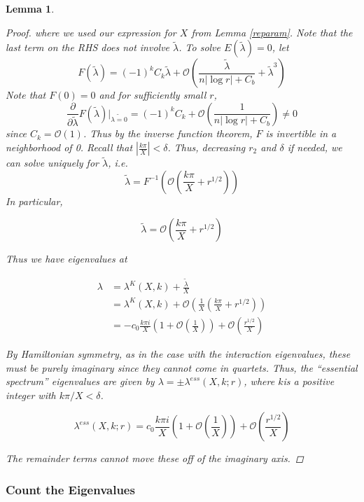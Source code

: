 \documentclass[12pt]{article}
\newtheorem{lemma}{Lemma}
\begin{document}
\begin{lemma}
\begin{proof}
where we used our expression for $X$ from Lemma \ref{reparam}. Note that the last term on the RHS does not involve $\tilde{\lambda}$. To solve $E(\tilde{\lambda}) = 0$, let
\[
F(\tilde{\lambda}) = (-1)^k C_k \tilde{\lambda} + \mathcal{O}\left( \frac{\tilde{\lambda}}{n|\log r| + C_b} + \tilde{\lambda}^3 \right)
\]
Note that $F(0) = 0$ and for sufficiently small $r$, 
\[
\frac{\partial}{\partial\tilde{\lambda}}F(\tilde{\lambda})\big|_{\tilde{\lambda = 0}}
= (-1)^k C_k + \mathcal{O}\left( \frac{1}{n|\log r| + C_b} \right) \neq 0
\]
since $C_k = \mathcal{O}(1)$. Thus by the inverse function theorem, $F$ is invertible in a neighborhood of 0. Recall that  $|\frac{k \pi}{X}| < \delta$. Thus, decreasing $r_2$ and $\delta$ if needed, we can solve uniquely for $\tilde{\lambda}$, i.e. 
\[
\tilde{\lambda} = F^{-1}\left( \mathcal{O} \left( \frac{k \pi}{X} + r^{1/2} \right)\right)
\]
In particular,

\[
\tilde{\lambda} = \mathcal{O}\left( \frac{k \pi}{X} + r^{1/2} \right)
\]

Thus we have eigenvalues at

\begin{align*}
\lambda &= \lambda^K(X,k) + \frac{\tilde{\lambda}}{X} \\
&= \lambda^K(X,k) + \mathcal{O}\left( \frac{1}{X} \left( \frac{k \pi}{X} + r^{1/2} \right) \right)\\
&= -c_0 \frac{k \pi i }{X} \left( 1 + \mathcal{O}\left( \frac{1}{X} \right)\right) + \mathcal{O}\left( \frac{r^{1/2}}{X} \right)
\end{align*}

By Hamiltonian symmetry, as in the case with the interaction eigenvalues, these must be purely imaginary since they cannot come in quartets. Thus, the ``essential spectrum'' eigenvalues are given by $\lambda = \pm \lambda^{ess}(X, k; r)$, where $k$is a positive integer with $k \pi/X < \delta$.

\[
\lambda^{ess}(X, k; r) = c_0 \frac{k \pi i }{X} \left( 1 + \mathcal{O}\left( \frac{1}{X} \right)\right) + \mathcal{O}\left( \frac{r^{1/2}}{X} \right)
\]

The remainder terms cannot move these off of the imaginary axis.

\end{proof}
\end{lemma}

\subsubsection{Count the Eigenvalues}
\end{document}
